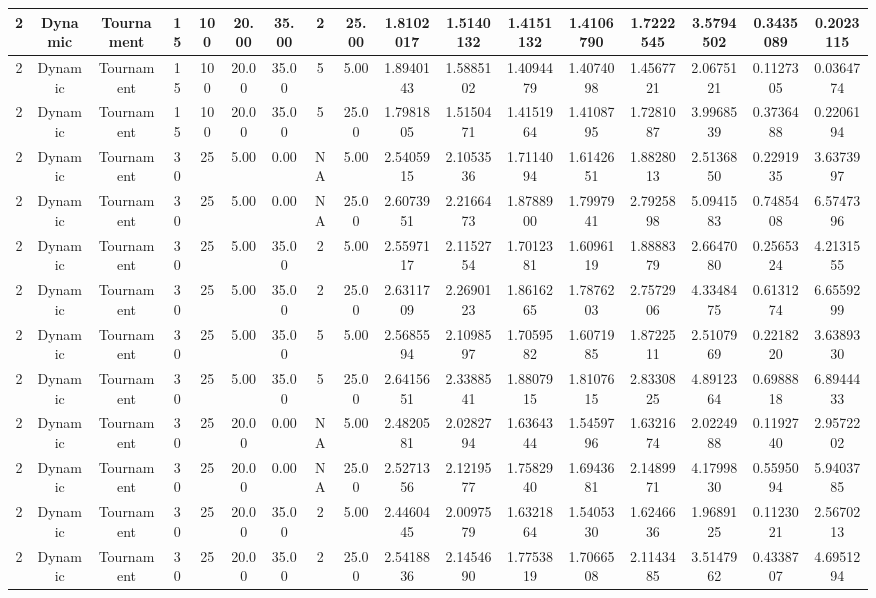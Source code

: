 \begin{longtable}{ | c | c | c | c | c | c | c | c | c | c | c | c | c | c | c | c | c | }
	\hline
	2	&	Dynamic	&	Tournament	&	15	&	100	&	20.00	&	35.00	&	2	&	25.00	&	1.8102017	&	1.5140132	&	1.4151132	&	1.4106790	&	1.7222545	&	3.5794502	&	0.3435089	&	0.2023115 \\
	\hline
	2	&	Dynamic	&	Tournament	&	15	&	100	&	20.00	&	35.00	&	5	&	5.00	&	1.8940143	&	1.5885102	&	1.4094479	&	1.4074098	&	1.4567721	&	2.0675121	&	0.1127305	&	0.0364774 \\
	\hline
	2	&	Dynamic	&	Tournament	&	15	&	100	&	20.00	&	35.00	&	5	&	25.00	&	1.7981805	&	1.5150471	&	1.4151964	&	1.4108795	&	1.7281087	&	3.9968539	&	0.3736488	&	0.2206194 \\
	\hline
	2	&	Dynamic	&	Tournament	&	30	&	25	&	5.00	&	0.00	&	NA	&	5.00	&	2.5405915	&	2.1053536	&	1.7114094	&	1.6142651	&	1.8828013	&	2.5136850	&	0.2291935	&	3.6373997 \\
	\hline
	2	&	Dynamic	&	Tournament	&	30	&	25	&	5.00	&	0.00	&	NA	&	25.00	&	2.6073951	&	2.2166473	&	1.8788900	&	1.7997941	&	2.7925898	&	5.0941583	&	0.7485408	&	6.5747396 \\
	\hline
	2	&	Dynamic	&	Tournament	&	30	&	25	&	5.00	&	35.00	&	2	&	5.00	&	2.5597117	&	2.1152754	&	1.7012381	&	1.6096119	&	1.8888379	&	2.6647080	&	0.2565324	&	4.2131555 \\
	\hline
	2	&	Dynamic	&	Tournament	&	30	&	25	&	5.00	&	35.00	&	2	&	25.00	&	2.6311709	&	2.2690123	&	1.8616265	&	1.7876203	&	2.7572906	&	4.3348475	&	0.6131274	&	6.6559299 \\
	\hline
	2	&	Dynamic	&	Tournament	&	30	&	25	&	5.00	&	35.00	&	5	&	5.00	&	2.5685594	&	2.1098597	&	1.7059582	&	1.6071985	&	1.8722511	&	2.5107969	&	0.2218220	&	3.6389330 \\
	\hline
	2	&	Dynamic	&	Tournament	&	30	&	25	&	5.00	&	35.00	&	5	&	25.00	&	2.6415651	&	2.3388541	&	1.8807915	&	1.8107615	&	2.8330825	&	4.8912364	&	0.6988818	&	6.8944433 \\
	\hline
	2	&	Dynamic	&	Tournament	&	30	&	25	&	20.00	&	0.00	&	NA	&	5.00	&	2.4820581	&	2.0282794	&	1.6364344	&	1.5459796	&	1.6321674	&	2.0224988	&	0.1192740	&	2.9572202 \\
	\hline
	2	&	Dynamic	&	Tournament	&	30	&	25	&	20.00	&	0.00	&	NA	&	25.00	&	2.5271356	&	2.1219577	&	1.7582940	&	1.6943681	&	2.1489971	&	4.1799830	&	0.5595094	&	5.9403785 \\
	\hline
	2	&	Dynamic	&	Tournament	&	30	&	25	&	20.00	&	35.00	&	2	&	5.00	&	2.4460445	&	2.0097579	&	1.6321864	&	1.5405330	&	1.6246636	&	1.9689125	&	0.1123021	&	2.5670213 \\
	\hline
	2	&	Dynamic	&	Tournament	&	30	&	25	&	20.00	&	35.00	&	2	&	25.00	&	2.5418836	&	2.1454690	&	1.7753819	&	1.7066508	&	2.1143485	&	3.5147962	&	0.4338707	&	4.6951294 \\

\end{longtable}
